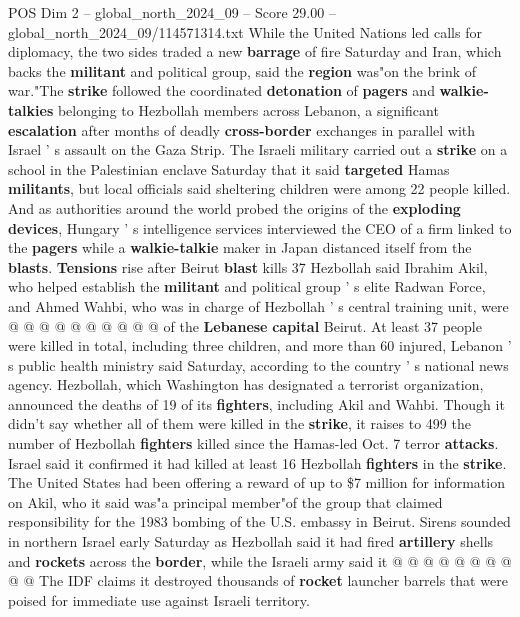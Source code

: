\begin{textsample}{POS Dim 2 – global\_north\_2024\_09 – Score 29.00 – global\_north\_2024\_09/114571314.txt}  \label{ex:f2_pos_126}
While the United Nations led calls for diplomacy, the two sides traded a new \textbf{barrage} of fire Saturday and Iran, which backs the \textbf{militant} and political group, said the \textbf{region} was"on the brink of war."The \textbf{strike} followed the coordinated \textbf{detonation} of \textbf{pagers} and \textbf{walkie-talkies} belonging to Hezbollah members across Lebanon, a significant \textbf{escalation} after months of deadly \textbf{cross-border} exchanges in parallel with Israel ' s assault on the Gaza Strip.
The Israeli military carried out a \textbf{strike} on a school in the Palestinian enclave Saturday that it said \textbf{targeted} Hamas \textbf{militants}, but local officials said sheltering children were among 22 people killed.
And as authorities around the world probed the origins of the \textbf{exploding} \textbf{devices}, Hungary ' s intelligence services interviewed the CEO of a firm linked to the \textbf{pagers} while a \textbf{walkie-talkie} maker in Japan distanced itself from the \textbf{blasts}. \textbf{Tensions} rise after Beirut \textbf{blast} kills 37 Hezbollah said Ibrahim Akil, who helped establish the \textbf{militant} and political group ' s elite Radwan Force, and Ahmed Wahbi, who was in charge of Hezbollah ' s central training unit, were @ @ @ @ @ @ @ @ @ @ of the \textbf{Lebanese} \textbf{capital} Beirut.
At least 37 people were killed in total, including three children, and more than 60 injured, Lebanon ' s public health ministry said Saturday, according to the country ' s national news agency.
Hezbollah, which Washington has designated a terrorist organization, announced the deaths of 19 of its \textbf{fighters}, including Akil and Wahbi.
Though it didn't say whether all of them were killed in the \textbf{strike}, it raises to 499 the number of Hezbollah \textbf{fighters} killed since the Hamas-led Oct. 7 terror \textbf{attacks}.
Israel said it confirmed it had killed at least 16 Hezbollah \textbf{fighters} in the \textbf{strike}.
The United States had been offering a reward of up to \$7 million for information on Akil, who it said was"a principal member"of the group that claimed responsibility for the 1983 bombing of the U.S. embassy in Beirut.
Sirens sounded in northern Israel early Saturday as Hezbollah said it had fired \textbf{artillery} shells and \textbf{rockets} across the \textbf{border}, while the Israeli army said it @ @ @ @ @ @ @ @ @ @ The IDF claims it destroyed thousands of \textbf{rocket} launcher barrels that were poised for immediate use against Israeli territory.

\end{textsample}
